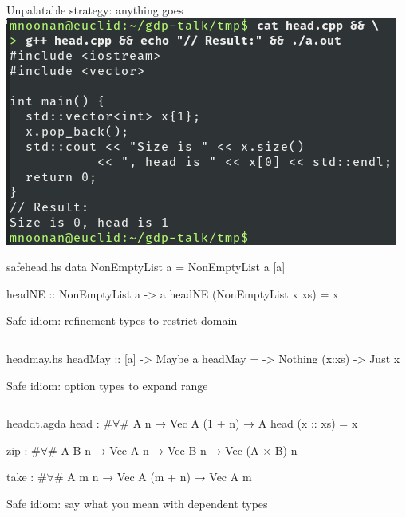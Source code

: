 \documentclass{beamer}
\begin{document}

\begin{frame}{Unpalatable strategy: anything goes}
  \includegraphics[width=0.8\paperwidth]{cppout}
\end{frame}

\begin{filecontents*}{safehead.hs}
data NonEmptyList a = NonEmptyList a [a]
  
headNE :: NonEmptyList a -> a
headNE (NonEmptyList x xs) = x  
\end{filecontents*}
\begin{frame}{Safe idiom: refinement types to restrict domain}
  \inputminted{haskell}{safehead.hs}
\end{frame}


\begin{filecontents*}{headmay.hs}
headMay :: [a] -> Maybe a
headMay = \case
    []     -> Nothing
    (x:xs) -> Just x
\end{filecontents*}
\begin{frame}{Safe idiom: option types to expand range}
  \inputminted{haskell}{headmay.hs}
\end{frame}

\begin{filecontents*}{headdt.agda}
head : #$\forall$# {A n} → Vec A (1 + n) → A
head (x :: xs) = x

zip : #$\forall$# {A B n} → Vec A n → Vec B n → Vec (A × B) n

take : #$\forall$# {A} m {n} → Vec A (m + n) → Vec A m
\end{filecontents*}
\begin{frame}{Safe idiom: say what you mean with dependent types}
  \inputminted{agda}{headdt.agda}
\end{frame}
\end{document}
